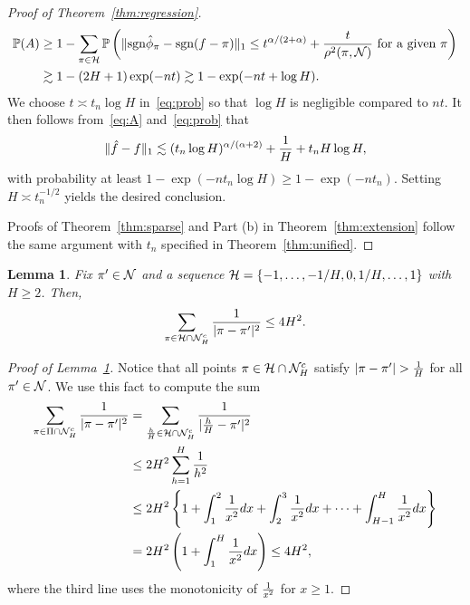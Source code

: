 \documentclass[11pt]{article}
\theoremstyle{plain}
\newtheorem{lem}{Lemma}
\theoremstyle{definition}
\def\sign{\textup{sgn}}
\begin{document}
\begin{proof}[Proof of Theorem~\ref{thm:regression}]
\begin{align}
\mathbb{P	}(A)&\geq 1-\sum_{\pi\in\tH}\mathbb{P}\left(\onenormSize{}{\sign \hat\phi_\pi-\sign(f-\pi)}\leq t^{\alpha/(2+\alpha)}+{t\over \rho^2(\pi,\tN)} \text{ for a given } \pi
\right)\notag \\
&\gtrsim 1-(2H+1)\exp(-nt)\gtrsim 1-\exp(-nt+\log H).
\end{align}
We choose $t \asymp t_n\log H$ in~\eqref{eq:prob} so that $\log H$ is negligible compared to $nt$. It then follows from~\eqref{eq:A} and~\eqref{eq:prob} that
\begin{align*}
\lVert\hat f-f\rVert_1\lesssim (t_n\log H)^{\alpha/(\alpha+2)}+{1\over H}+t_nH\log H,
\end{align*}
with probability at least $1-\exp(-nt_n\log H)\geq 1-\exp(-nt_n)$. Setting $H\asymp t^{-1/2}_n$ yields the desired conclusion. 

Proofs of Theorem~\ref{thm:sparse} and Part (b) in Theorem~\ref{thm:extension} follow the same argument with $t_n$ specified in Theorem~\ref{thm:unified}.
 \end{proof}

\begin{lem}\label{lem:H}
Fix $\pi'\in\mathcal{N}$ and a sequence $\mathcal{H}=\{-1,\ldots,-1/H,0,1/H,\ldots,1\}$ with $H\geq 2$. Then, 
\[
\sum_{\pi \in \mathcal{H}\cap \mathcal{N}_H^c}{1\over 
|\pi-\pi'|^2}\leq 4H^2. 
\]
\end{lem}
\begin{proof}[Proof of Lemma~\ref{lem:H}]
Notice that all points $\pi\in\mathcal{H}\cap\mathcal{N}_H^c$ satisfy $|\pi-\pi'|>{1\over H}$ for all $\pi'\in\mathcal{N}$. We use this fact to compute the sum
\begin{align}
   \sum_{\pi \in \Pi\cap \mathcal{N}_H^c}{1\over |\pi-\pi'|^2}&= \sum_{\frac{h}{H}\in\mathcal{H}\cap \mathcal{N}_H^c } {1\over |\frac{h}{H}-\pi'|^2}\\
   &\leq 2H^2\sum_{h=1}^{H}{1 \over h^2}\\
 &\leq 2H^2\left\{ 1+\int_{1}^2{1\over x^2}dx+ \int_{2}^3{1\over x^2}dx+\cdots + \int_{H-1}^H{1\over x^2}dx\right\}\\
&= 2H^2\left(1+\int^{H}_{1}{1\over x^2}dx\right) \leq 4H^2,
\end{align}
 where the third line uses the monotonicity of ${1\over x^2}$ for $x\geq 1$. 
 \end{proof}
\end{document}
